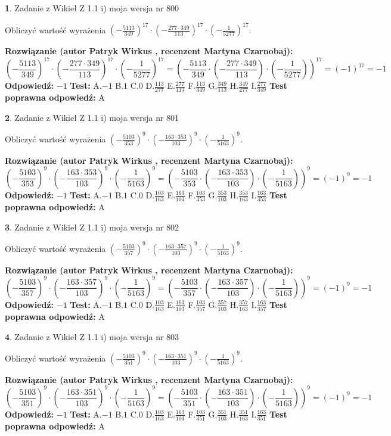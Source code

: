\documentclass[12pt, a4paper]{article}
\theoremstyle{definition} %
\newtheorem{zad}{}
\newcommand{\zadStart}[1]{\begin{zad}#1\newline}
\newcommand{\zadStop}{\end{zad}}
\newcommand{\rozwStart}[2]{\noindent \textbf{Rozwiązanie (autor #1 , recenzent #2): }\newline}
\newcommand{\rozwStop}{\newline}
\newcommand{\odpStart}{\noindent \textbf{Odpowiedź:}\newline}
\newcommand{\odpStop}{\newline}
\newcommand{\testStart}{\noindent \textbf{Test:}\newline}
\newcommand{\testStop}{\newline}
\newcommand{\kluczStart}{\noindent \textbf{Test poprawna odpowiedź:}\newline}
\newcommand{\kluczStop}{\newline}
\begin{document}
\zadStart{Zadanie z Wikieł Z 1.1 i) moja wersja nr 800}

Obliczyć wartość wyrażenia $(-\frac{5113}{349})^{17} \cdot (-\frac{277 \cdot 349}{113})^{17} \cdot (-\frac{1}{5277})^{17}$.
\zadStop
\rozwStart{Patryk Wirkus}{Martyna Czarnobaj}
$$(-\frac{5113}{349})^{17} \cdot (-\frac{277 \cdot 349}{113})^{17} \cdot (-\frac{1}{5277})^{17} = (-\frac{5113}{349} \cdot (-\frac{277 \cdot 349}{113}) \cdot (-\frac{1}{5277}))^{17} = (-1)^{17} = -1$$
\rozwStop
\odpStart
$-1$
\odpStop
\testStart
A.$-1$ B.$1$ C.$0$ D.$\frac{113}{277}$ E.$\frac{277}{113}$
F.$\frac{113}{349}$ G.$\frac{349}{113}$
H.$\frac{349}{277}$
I.$\frac{277}{349}$
\testStop
\kluczStart
A
\kluczStop



\zadStart{Zadanie z Wikieł Z 1.1 i) moja wersja nr 801}

Obliczyć wartość wyrażenia $(-\frac{5103}{353})^{9} \cdot (-\frac{163 \cdot 353}{103})^{9} \cdot (-\frac{1}{5163})^{9}$.
\zadStop
\rozwStart{Patryk Wirkus}{Martyna Czarnobaj}
$$(-\frac{5103}{353})^{9} \cdot (-\frac{163 \cdot 353}{103})^{9} \cdot (-\frac{1}{5163})^{9} = (-\frac{5103}{353} \cdot (-\frac{163 \cdot 353}{103}) \cdot (-\frac{1}{5163}))^{9} = (-1)^{9} = -1$$
\rozwStop
\odpStart
$-1$
\odpStop
\testStart
A.$-1$ B.$1$ C.$0$ D.$\frac{103}{163}$ E.$\frac{163}{103}$
F.$\frac{103}{353}$ G.$\frac{353}{103}$
H.$\frac{353}{163}$
I.$\frac{163}{353}$
\testStop
\kluczStart
A
\kluczStop



\zadStart{Zadanie z Wikieł Z 1.1 i) moja wersja nr 802}

Obliczyć wartość wyrażenia $(-\frac{5103}{357})^{9} \cdot (-\frac{163 \cdot 357}{103})^{9} \cdot (-\frac{1}{5163})^{9}$.
\zadStop
\rozwStart{Patryk Wirkus}{Martyna Czarnobaj}
$$(-\frac{5103}{357})^{9} \cdot (-\frac{163 \cdot 357}{103})^{9} \cdot (-\frac{1}{5163})^{9} = (-\frac{5103}{357} \cdot (-\frac{163 \cdot 357}{103}) \cdot (-\frac{1}{5163}))^{9} = (-1)^{9} = -1$$
\rozwStop
\odpStart
$-1$
\odpStop
\testStart
A.$-1$ B.$1$ C.$0$ D.$\frac{103}{163}$ E.$\frac{163}{103}$
F.$\frac{103}{357}$ G.$\frac{357}{103}$
H.$\frac{357}{163}$
I.$\frac{163}{357}$
\testStop
\kluczStart
A
\kluczStop



\zadStart{Zadanie z Wikieł Z 1.1 i) moja wersja nr 803}

Obliczyć wartość wyrażenia $(-\frac{5103}{351})^{9} \cdot (-\frac{163 \cdot 351}{103})^{9} \cdot (-\frac{1}{5163})^{9}$.
\zadStop
\rozwStart{Patryk Wirkus}{Martyna Czarnobaj}
$$(-\frac{5103}{351})^{9} \cdot (-\frac{163 \cdot 351}{103})^{9} \cdot (-\frac{1}{5163})^{9} = (-\frac{5103}{351} \cdot (-\frac{163 \cdot 351}{103}) \cdot (-\frac{1}{5163}))^{9} = (-1)^{9} = -1$$
\rozwStop
\odpStart
$-1$
\odpStop
\testStart
A.$-1$ B.$1$ C.$0$ D.$\frac{103}{163}$ E.$\frac{163}{103}$
F.$\frac{103}{351}$ G.$\frac{351}{103}$
H.$\frac{351}{163}$
I.$\frac{163}{351}$
\testStop
\kluczStart
A
\kluczStop
\end{document}
